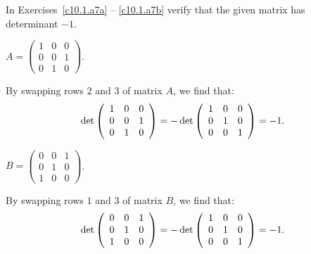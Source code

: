 \documentclass{ximera}
\begin{document}
\noindent In Exercises~\ref{c10.1.a7a} -- \ref{c10.1.a7b} verify 
that the given matrix has determinant $-1$.
\begin{exercise} \label{c10.1.a7a}
$A = \left( \begin{array}{rrr}
1  &  0  &  0\\
0  &  0  &  1\\
0  &  1  &  0
\end{array} \right)$.

\begin{solution}
\soln
By swapping rows $2$ and $3$ of matrix $A$, we find that:
\[
\det\left(\begin{array}{rrr} 1 & 0 & 0 \\ 0 & 0 & 1 \\ 0 & 1 & 0\end{array}\right) =
-\det\left(\begin{array}{rrr} 1 & 0 & 0 \\ 0 & 1 & 0 \\ 0 & 0 & 1\end{array}\right) = -1. \\
\]

\end{solution}
\end{exercise}
\begin{exercise} \label{c10.1.a7b}
$B = \left( \begin{array}{rrr}
 0 &   0 &   1\\
 0 &   1 &   0\\
 1 &   0 &   0
\end{array} \right)$.

\begin{solution}
\soln
By swapping rows $1$ and $3$ of matrix $B$, we find that:
\[
\det\left(\begin{array}{rrr} 0 & 0 & 1 \\ 0 & 1 & 0 \\ 1 & 0 & 0\end{array}\right) =
-\det\left(\begin{array}{rrr} 1 & 0 & 0 \\ 0 & 1 & 0 \\ 0 & 0 & 1\end{array}\right) = -1.
\]


\end{solution}
\end{exercise}
\end{document}
